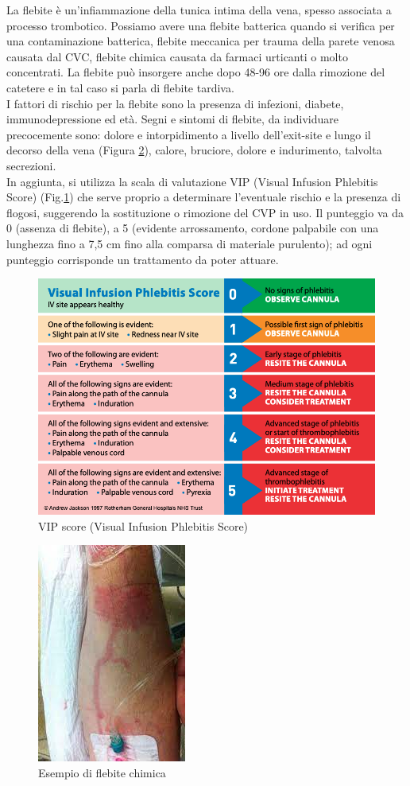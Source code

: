 La flebite è un’infiammazione della tunica intima della vena, spesso associata a processo trombotico. 
Possiamo avere una flebite batterica quando si verifica per una contaminazione batterica, flebite meccanica per 
trauma della parete venosa causata dal CVC, flebite chimica causata da farmaci urticanti o molto concentrati. 
La flebite può insorgere anche dopo 48-96 ore dalla rimozione del catetere e in tal caso si parla di flebite tardiva.\\ 
I fattori di rischio per la flebite sono la presenza di infezioni, diabete, immunodepressione ed età. 
Segni e sintomi di flebite, da individuare precocemente sono: dolore e intorpidimento a livello dell’exit-site e lungo 
il decorso della vena (Figura \ref{fig:FIGURE_4.17}), 
calore, bruciore, dolore e indurimento, talvolta secrezioni\cite{AIOMCVC}.\\
In aggiunta, si utilizza la scala di valutazione VIP (Visual Infusion Phlebitis Score) (Fig.\ref{fig:FIGURE_4.16}) che 
serve proprio a determinare l'eventuale rischio e la presenza di flogosi, 
suggerendo la sostituzione o rimozione del CVP in uso. Il punteggio va da 0 
(assenza di flebite), a 5 (evidente arrossamento, cordone palpabile con una lunghezza fino a 7,5 cm 
fino alla comparsa di materiale purulento); ad ogni punteggio corrisponde un trattamento da poter attuare\cite{FNOPIRIVISTA}.

\begin{figure}[H]
    \begin{center}
    \includegraphics[width=0.6\columnwidth]{img/VIPSCORE.png}
    \vspace{-3mm}
    \end{center}
    \caption{VIP score (Visual Infusion Phlebitis Score)
    \cite{img52}}
    \label{fig:FIGURE_4.16}
\end{figure}

\begin{figure}[H]
    \begin{center}
    \includegraphics[width=0.2\columnwidth]{img/flebite.jpeg}
    \vspace{-3mm}
    \end{center}
    \caption{Esempio di flebite chimica
    \cite{img53}}
    \label{fig:FIGURE_4.17}
\end{figure}

